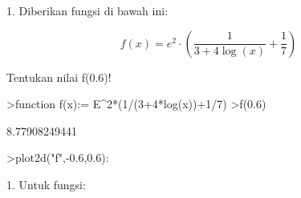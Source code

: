 \documentclass[a4paper,10pt]{article}
\begin{document}
\begin{eulernotebook}
\begin{eulercomment}
\begin{eulercomment}
\begin{eulercomment}
\begin{eulercomment}
\begin{eulercomment}
\begin{eulercomment}
\begin{eulercomment}
\begin{eulercomment}
\begin{eulercomment}
\begin{eulercomment}
\begin{eulercomment}
\begin{eulercomment}
\begin{eulercomment}
\begin{eulercomment}
\begin{eulercomment}
\begin{eulercomment}
\begin{eulercomment}
1. Diberikan fungsi di bawah ini:

\end{eulercomment}
\begin{eulerformula}
\[
f(x)=e^2 \cdot \left( \frac{1}{3+4 \log(x)}+\frac{1}{7} \right)
\]
\end{eulerformula}
\begin{eulercomment}
Tentukan nilai f(0.6)!
\end{eulercomment}
\begin{eulerprompt}
>function f(x):= E^2*(1/(3+4*log(x))+1/7)
>f(0.6)
\end{eulerprompt}
\begin{euleroutput}
  8.77908249441
\end{euleroutput}
\begin{eulerprompt}
>plot2d("f",-0.6,0.6):
\end{eulerprompt}
\begin{eulercomment}
1. Untuk fungsi:


\end{eulercomment}
\end{eulercomment}
\end{eulercomment}
\end{eulercomment}
\end{eulercomment}
\end{eulercomment}
\end{eulercomment}
\end{eulercomment}
\end{eulercomment}
\end{eulercomment}
\end{eulercomment}
\end{eulercomment}
\end{eulercomment}
\end{eulercomment}
\end{eulercomment}
\end{eulercomment}
\end{eulercomment}
\end{eulernotebook}
\end{document}
